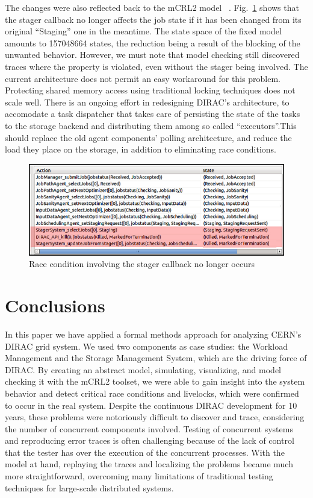 \documentclass[sort&compress,preprint,3p]{elsarticle}
\begin{document}
The changes were also reflected back to the mCRL2 model ~\cite{svn_mcrl2}. Fig.~\ref{fig:zombieJobFix}
shows that the stager callback no longer affects the job state if it has been changed from its
original ``Staging'' one in the meantime. 
The state space of the fixed model amounts to 
157048664 states, the reduction being a result of the blocking of the unwanted behavior.
However, we must note that model checking still discovered traces where the property 
is violated, even without the stager being involved.
The current architecture does not permit an easy workaround for this problem.
Protecting shared memory access using traditional locking techniques does not scale well.
There is an ongoing effort in redesigning DIRAC's architecture, to accomodate
a task dispatcher that takes care of persisting the state of the tasks to the storage 
backend and distributing them among so called ``executors''.This should 
replace the old agent components' polling architecture, and reduce the load
they place on the storage, in addition to eliminating race conditions.

\begin{figure}[tp]
\includegraphics[width=0.6\linewidth,keepaspectratio=true]{./Figure12.png}
\centering
\caption{ Race condition involving the stager callback no longer occurs}
\label{fig:zombieJobFix}
\end{figure}%

\section{Conclusions}
\label{sec:Section_5}
In this paper we have applied a formal methods approach for analyzing CERN's 
DIRAC grid system. 
We used two components as case studies: the Workload
Management and the Storage Management System, which are the driving force 
of DIRAC.
By creating an abstract model, simulating, visualizing, and model checking it with the mCRL2 toolset,
we were able to gain insight into the system behavior and detect critical
race conditions and livelocks, which  
were confirmed to occur in the real system. 
Despite the continuous DIRAC development for 10 years, these problems 
were notoriously difficult to discover and trace, considering the number of concurrent components involved. 
Testing of concurrent systems and reproducing error traces is often challenging because of the lack of 
control that the tester has over the execution of the concurrent processes. 
With the model at hand, replaying
the traces and localizing the problems became much more straightforward, overcoming many limitations of
traditional testing techniques for large-scale distributed systems. 
\end{document}
